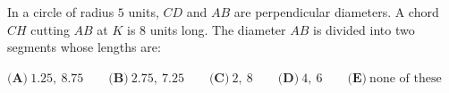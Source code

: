 In a circle of radius $5$ units, $CD$ and $AB$ are perpendicular diameters. A chord $CH$ cutting $AB$ at $K$ is $8$ units long. The diameter $AB$ is divided into two segments whose lengths are:

$\textbf{(A)}\ 1.25,\ 8.75 \qquad \textbf{(B)}\ 2.75,\ 7.25 \qquad \textbf{(C)}\ 2,\ 8 \qquad \textbf{(D)}\ 4,\ 6 \qquad \textbf{(E)}\ \text{none of these}$
